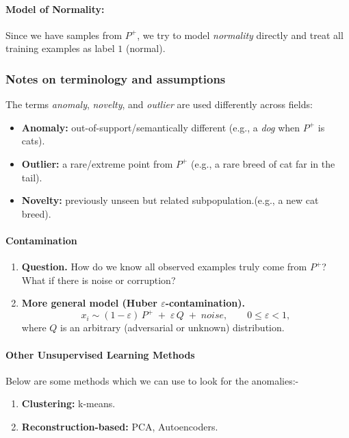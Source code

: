 \documentclass[11pt]{article}
\theoremstyle{plain}
\begin{document}
\paragraph{Model of Normality:}
Since we have samples from $P^{
+
}$, we try to model \emph{normality} directly and treat all training examples as label $1$ (normal).

\subsubsection{Notes on terminology and assumptions}
The terms \emph{anomaly}, \emph{novelty}, and \emph{outlier} are used differently across fields:
\begin{itemize}
  \item \textbf{Anomaly:} out-of-support/semantically different (e.g., a \emph{dog} when $P^{+}$ is cats).
  \item \textbf{Outlier:} a rare/extreme point from $P^{+}$ (e.g., a rare breed of cat far in the tail).
  \item \textbf{Novelty:} previously unseen but related subpopulation.(e.g., a new cat breed).
\end{itemize}

\paragraph{Contamination}
\begin{enumerate}
  \item \textbf{Question.} How do we know all observed examples truly come from $P^{+}$? What if there is noise or corruption?
  \item \textbf{More general model (Huber $\varepsilon$-contamination).}
  \[
    x_i \sim (1-\varepsilon)\,P^{+} \;+\; \varepsilon\,Q\;+\;noise,\qquad 0\le \varepsilon<1,
  \]
  where $Q$ is an arbitrary (adversarial or unknown) distribution.
\end{enumerate}

\paragraph{Other Unsupervised Learning Methods}
Below are some methods which we can use to look for the anomalies:-
\begin{enumerate}
  \item \textbf{Clustering:} k-means.
  \item \textbf{Reconstruction-based:} PCA, Autoencoders.
\end{enumerate}
\end{document}
